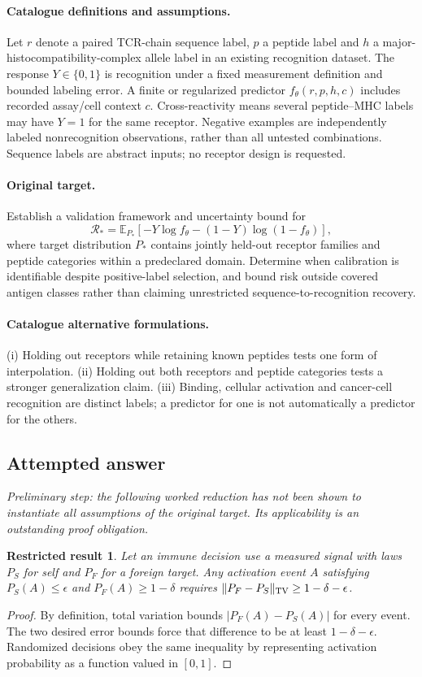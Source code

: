 \documentclass[11pt]{article}
\newcommand{\E}{\mathbb E}
\providecommand{\E}{\mathbb E}
\newtheorem{attemptresult}{Restricted result}[section]
\begin{document}
\paragraph{Catalogue definitions and assumptions.}
Let $r$ denote a paired TCR-chain sequence label, $p$ a peptide label and $h$ a major-histocompatibility-complex allele label in an existing recognition dataset. The response $Y\in\{0,1\}$ is recognition under a fixed measurement definition and bounded labeling error. A finite or regularized predictor $f_\theta(r,p,h,c)$ includes recorded assay/cell context $c$. Cross-reactivity means several peptide--MHC labels may have $Y=1$ for the same receptor. Negative examples are independently labeled nonrecognition observations, rather than all untested combinations. Sequence labels are abstract inputs; no receptor design is requested.
\paragraph{Original target.}
Establish a validation framework and uncertainty bound for
    \[\mathcal R_*=\E_{P_*}[-Y\log f_\theta-(1-Y)\log(1-f_\theta)],\]
    where target distribution $P_*$ contains jointly held-out receptor families and peptide categories within a predeclared domain. Determine when calibration is identifiable despite positive-label selection, and bound risk outside covered antigen classes rather than claiming unrestricted sequence-to-recognition recovery.
\paragraph{Catalogue alternative formulations.}
(i) Holding out receptors while retaining known peptides tests one form of interpolation. (ii) Holding out both receptors and peptide categories tests a stronger generalization claim. (iii) Binding, cellular activation and cancer-cell recognition are distinct labels; a predictor for one is not automatically a predictor for the others.
\subsection{Attempted answer}
\noindent\emph{Preliminary step: the following worked reduction has not been shown to instantiate all assumptions of the original target. Its applicability is an outstanding proof obligation.}

\begin{attemptresult}
Let an immune decision use a measured signal with laws $P_S$ for self and $P_F$ for a foreign target. Any activation event $A$ satisfying $P_S(A)\leq\epsilon$ and $P_F(A)\geq1-\delta$ requires $\|P_F-P_S\|_{\rm TV}\geq1-\delta-\epsilon$.
\end{attemptresult}
\begin{proof}
By definition, total variation bounds $|P_F(A)-P_S(A)|$ for every event. The two desired error bounds force that difference to be at least $1-\delta-\epsilon$. Randomized decisions obey the same inequality by representing activation probability as a function valued in $[0,1]$.
\end{proof}
\end{document}
